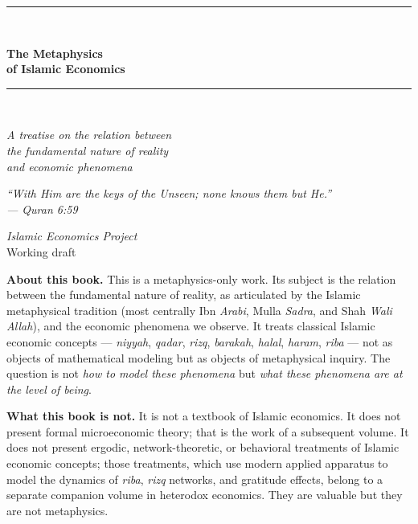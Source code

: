 \documentclass[11pt,a4paper,openany]{book}
\theoremstyle{cleanrm}
\newcommand{\arb}[1]{\textit{#1}}
\newcommand{\Quran}[1]{Quran #1}
\begin{document}

\frontmatter

\begin{titlepage}
\centering
\vspace*{1.5cm}
{\color{themegreen}\rule{0.6\textwidth}{1pt}}\\[1em]
{\Huge\bfseries\color{themegreen} The Metaphysics\\[0.2em] of Islamic Economics\par}
\vspace{0.8em}
{\color{themegold}\rule{0.4\textwidth}{0.5pt}}\\[1em]
{\Large\itshape A treatise on the relation between\\[0.2em]
the fundamental nature of reality\\[0.2em]
and economic phenomena\par}
\vspace{4cm}

{\itshape\large
``With Him are the keys of the Unseen; none knows them but He.''\\[0.3em]
--- \Quran{6:59}\par}

\vfill
{\large \textit{Islamic Economics Project}}\\[0.3em]
{\small Working draft}
\end{titlepage}

\thispagestyle{empty}
\vspace*{2in}
\noindent\textbf{About this book.} This is a metaphysics-only work. Its
subject is the relation between the fundamental nature of reality, as
articulated by the Islamic metaphysical tradition (most centrally Ibn
\arb{Arabi}, Mulla \arb{Sadra}, and Shah \arb{Wali Allah}), and the
economic phenomena we observe. It treats classical Islamic economic
concepts --- \arb{niyyah}, \arb{qadar}, \arb{rizq}, \arb{barakah},
\arb{halal}, \arb{haram}, \arb{riba} --- not as objects of mathematical
modeling but as objects of metaphysical inquiry. The question is not
\textit{how to model these phenomena} but \textit{what these phenomena
are at the level of being}.

\vspace{0.3in}
\noindent\textbf{What this book is not.} It is not a textbook of Islamic
economics. It does not present formal microeconomic theory; that is the
work of a subsequent volume. It does not present ergodic, network-theoretic,
or behavioral treatments of Islamic economic concepts; those treatments,
which use modern applied apparatus to model the dynamics of \arb{riba},
\arb{rizq} networks, and gratitude effects, belong to a separate companion
volume in heterodox economics. They are valuable but they are not
metaphysics.
\end{document}
